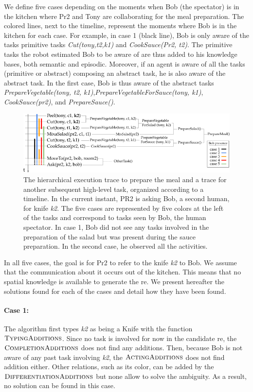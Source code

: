 We define five cases depending on the moments when Bob (the spectator) is in the kitchen where Pr2 and Tony are collaborating for the meal preparation. The colored lines, next to the timeline, represent the moments where Bob is in the kitchen for each case. For example, in case 1 (black line), Bob is only aware of the tasks primitive tasks \textit{Cut(tony,t2,k1)} and \textit{CookSauce(Pr2, t2)}. The primitive tasks the robot estimated Bob to be aware of are thus added to his knowledge bases, both semantic and episodic. Moreover, if an agent is aware of all the tasks (primitive or abstract) composing an abstract task, he is also aware of the abstract task. In the first case, Bob is thus aware of the abstract tasks \textit{PrepareVegetable(tony, t2, k1)},\textit{PrepareVegetableForSauce(tony, k1)}, \textit{CookSauce(pr2)}, and \textit{PrepareSauce()}.

\begin{figure}[ht!]
\centering
\includegraphics[width=\textwidth]{figures/chapter6/prepare_meal_plan.png}
\caption{\label{fig:chap6_meal_plan} The hierarchical execution trace to prepare the meal and a trace for another subsequent high-level task, organized according to a timeline. In the current instant, PR2 is asking Bob, a second human, for knife \textit{k2}. The five cases are represented by five colors at the left of the tasks and correspond to tasks seen by Bob, the human spectator. In case 1, Bob did not see any tasks involved in the preparation of the salad but was present during the sauce preparation. In the second case, he observed all the activities.}
\end{figure}

In all five cases, the goal is for Pr2 to refer to the knife \textit{k2} to Bob. We assume that the communication about it occurs out of the kitchen. This means that no spatial knowledge is available to generate the \acrshort{re}. We present hereafter the solutions found for each of the cases and detail how they have been found.

\paragraph{Case 1:} The algorithm first types \textit{k2} as being a Knife with the function $\textsc{TypingAdditions}$.
Since no task is involved for now in the candidate \acrshort{re}, the $\textsc{CompletionAdditions}$ does not find any additions. Then, because Bob is not aware of any past task involving \textit{k2}, the $\textsc{ActingAdditions}$ does not find addition either. Other relations, such as its color, can be added by the $\textsc{DifferentiationAdditions}$ but none allow to solve the ambiguity. As a result, no solution can be found in this case.

